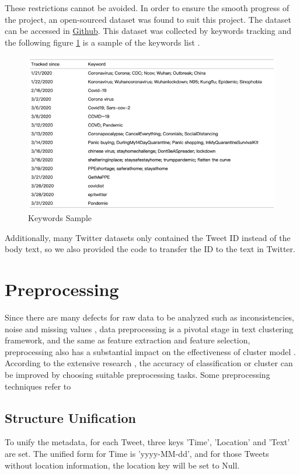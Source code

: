 These restrictions cannot be avoided. In order to ensure the smooth progress of the project, an open-sourced dataset was found to suit this project. The dataset can be accessed in  \href{https://github.com/echen102/COVID-19-TweetIDs}{Github}. This dataset was collected by keywords tracking and the following figure \ref{fig:4} is a sample of the keywords list \cite{chen2020tracking}.

\begin{figure}[H]
    \centering
    \includegraphics[scale=1.4]{images/keyword.png}
    \caption{Keywords Sample}
    \label{fig:4}
\end{figure}

Additionally, many Twitter datasets only contained the Tweet ID instead of the body text, so we also provided the code to transfer the ID to the text in Twitter.

\section{Preprocessing}
Since there are many defects for raw data to be analyzed such as inconsistencies, noise and missing values \cite{ramirez2017survey}, data preprocessing is a pivotal stage in text clustering framework, and the same as feature extraction and feature selection, preprocessing also has a substantial impact on the effectiveness of cluster model \cite{uysal2014impact}. According to the extensive research \cite{uysal2014impact}, the accuracy of classification or cluster can be improved by choosing suitable preprocessing tasks. Some preprocessing techniques refer to \cite{10.1007/978-3-319-67008-9_31}

\subsection{Structure Unification}
To unify the metadata, for each Tweet, three keys 'Time', 'Location' and 'Text' are set. The unified form for Time is 'yyyy-MM-dd', and for those Tweets without location information, the location key will be set to Null.

